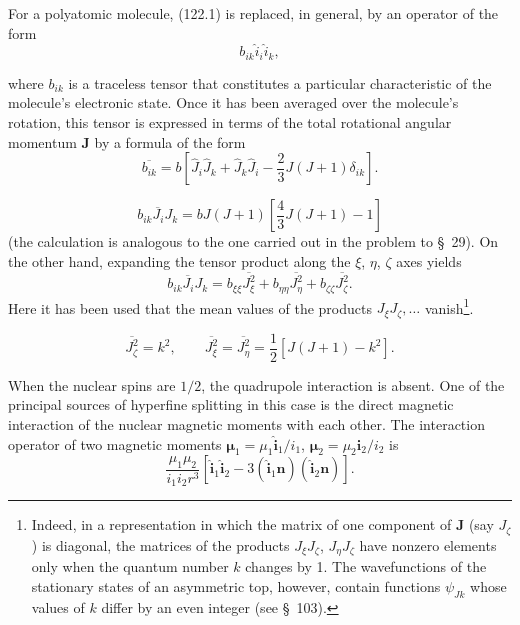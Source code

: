 For a polyatomic molecule, (122.1) is replaced, in general, by an operator of
the form
\begin{equation}
 b_{ik}\hat i_i\hat i_k,
 \tag{122.3}
\end{equation}

where $b_{ik}$ is a traceless tensor that constitutes a particular
characteristic of the molecule's electronic state. Once it has been averaged
over the molecule's rotation, this tensor is expressed in terms of the total
rotational angular momentum $\mathbf J$ by a formula of the form
\begin{equation}
 \overline{b_{ik}}=b\left[\hat J_i\hat J_k+\hat J_k\hat J_i
 -\frac23J(J+1)\delta_{ik}\right].
 \tag{122.4}
\end{equation}


\begin{equation}
 \overline{b_{ik}J_iJ_k}
 =bJ(J+1)\left[\frac43J(J+1)-1\right]
 \tag{122.5}
\end{equation}
(the calculation is analogous to the one carried out in the problem to
\S~29). On the other hand, expanding the tensor product along the $\xi$,
$\eta$, $\zeta$ axes yields
\begin{equation}
 \overline{b_{ik}J_iJ_k}
 =b_{\xi\xi}\overline{J_\xi^2}
 +b_{\eta\eta}\overline{J_\eta^2}
 +b_{\zeta\zeta}\overline{J_\zeta^2}.
 \tag{122.6}
\end{equation}
Here it has been used that the mean values of the products
$J_\xi J_\zeta,\ldots$ vanish\footnote{Indeed, in a representation in which
the matrix of one component of $\mathbf J$ (say $J_\zeta$) is diagonal, the
matrices of the products $J_\xi J_\zeta$, $J_\eta J_\zeta$ have nonzero
elements only when the quantum number $k$ changes by 1. The wavefunctions of
the stationary states of an asymmetric top, however, contain functions
$\psi_{Jk}$ whose values of $k$ differ by an even integer (see \S~103).}.

\[
 \overline{J_\zeta^2}=k^2,\qquad
 \overline{J_\xi^2}=\overline{J_\eta^2}
 =\frac12[J(J+1)-k^2].
\]

When the nuclear spins are $1/2$, the quadrupole interaction is absent. One
of the principal sources of hyperfine splitting in this case is the direct
magnetic interaction of the nuclear magnetic moments with each other. The
interaction operator of two magnetic moments
$\boldsymbol\mu_1=\mu_1\hat{\mathbf i}_1/i_1$,
$\boldsymbol\mu_2=\mu_2\hat{\mathbf i}_2/i_2$ is
\[
 \frac{\mu_1\mu_2}{i_1i_2r^3}
 [\hat{\mathbf i}_1\hat{\mathbf i}_2
 -3(\hat{\mathbf i}_1\mathbf n)(\hat{\mathbf i}_2\mathbf n)].
\]

